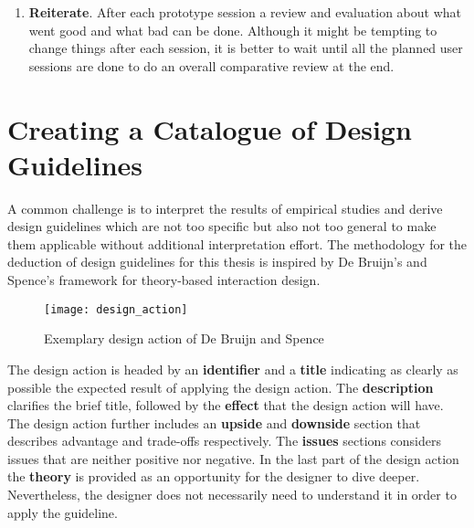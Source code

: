 \begin{enumerate}
	\item \textbf{Reiterate}. After each prototype session a review and evaluation about what went good and what bad can be done. Although it might be tempting to change things after each session, it is better to wait until all the planned user sessions are done to do an overall comparative review at the end.
\end{enumerate}

\section{Creating a Catalogue of Design Guidelines}

A common challenge is to interpret the results of empirical studies and derive design guidelines which are not too specific but also not too general to make them applicable without additional interpretation effort. The methodology for the deduction of design guidelines for this thesis is inspired by De Bruijn's and Spence's \cite{de2008new} framework for theory-based interaction design. 

\begin{figure}[h]
	\centering
	\texttt{[image: design\_action]}
	\caption{Exemplary design action of De Bruijn and Spence \cite{de2008new}}
	\label{fig:designaction} %
\end{figure}

The design action is headed by an \textbf{identifier} and a \textbf{title} indicating as clearly as possible the expected result of applying the design action. The \textbf{description} clarifies the brief title, followed by the \textbf{effect} that the design action will have. The design action further includes an \textbf{upside} and \textbf{downside} section that describes advantage and trade-offs respectively. The \textbf{issues} sections considers issues that are neither positive nor negative. In the last part of the design action the \textbf{theory} is provided as an opportunity for the designer to dive deeper. Nevertheless, the designer does not necessarily need to understand it in order to apply the guideline.

